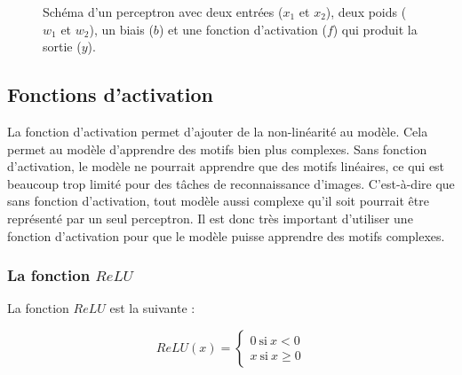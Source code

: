 \documentclass{article}
\begin{document}
\begin{figure}[H]
\centering
{}
\caption{Schéma d'un perceptron avec deux entrées ($x_1$ et $x_2$), deux poids ($w_1$ et $w_2$), un biais ($b$) et une fonction d'activation ($f$) qui produit la sortie ($y$).}
\end{figure}

\subsection{Fonctions d'activation}

La fonction d'activation permet d'ajouter de la non-linéarité au modèle. Cela permet au modèle d'apprendre des motifs bien plus complexes. Sans fonction d'activation, le modèle ne pourrait apprendre que des motifs linéaires, ce qui est beaucoup trop limité pour des tâches de reconnaissance d'images. C'est-à-dire que sans fonction d'activation, tout modèle aussi complexe qu'il soit pourrait être représenté par un seul perceptron. Il est donc très important d'utiliser une fonction d'activation pour que le modèle puisse apprendre des motifs complexes.

\subsubsection{La fonction $ReLU$}
La fonction $ReLU$ est la suivante :

\[
ReLU(x) = 
\begin{cases}
0 \ \text{si} \ x < 0 \\
x \ \text{si} \ x \geq 0
\end{cases}
\]
\end{document}
